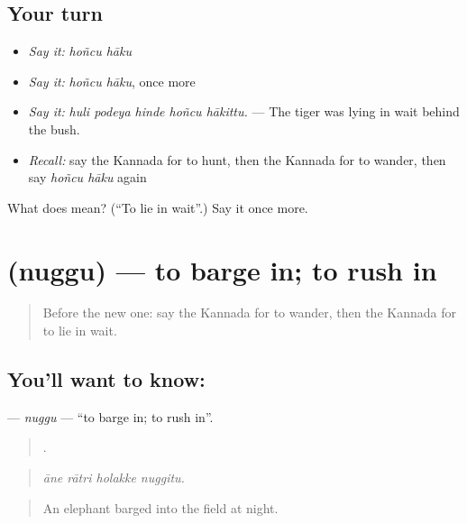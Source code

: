 \subsection*{Your turn}
\begin{itemize}
\raggedright
  \item \emph{Say it:} \emph{hoñcu hāku}
  \item \emph{Say it:} \emph{hoñcu hāku}, once more
  \item \emph{Say it:} \emph{huli podeya hinde hoñcu hākittu.} — The tiger was lying in wait behind the bush.
  \item \emph{Recall:} say the Kannada for to hunt, then the Kannada for to wander, then say \emph{hoñcu hāku} again
\end{itemize}

\begin{tcolorbox}[breakable,colback=teal!4,colframe=teal!35!black,title={Before you move on}]
What does   mean? (\textquotedblleft{}To lie in wait\textquotedblright{}.) Say it once more.
\end{tcolorbox}
\section[\texorpdfstring{\kn{ನುಗ್ಗು} (nuggu)}{ನುಗ್ಗು (nuggu)}]{ (nuggu) — to barge in; to rush in}

\label{lesson:KA-C360-nuggu}



\begin{quote}
Before the new one: say the Kannada for to wander, then the Kannada for to lie in wait.
\end{quote}

\subsection*{You'll want to know: }
\textbf{} — \emph{nuggu} — \textquotedblleft{}to barge in; to rush in\textquotedblright{}.

\begin{quote}
   .
\end{quote}

\begin{quote}
\emph{āne rātri holakke nuggitu.}
\end{quote}

\begin{quote}
An elephant barged into the field at night.
\end{quote}

